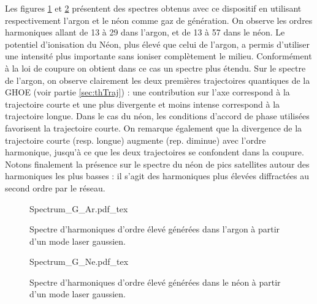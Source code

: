 Les figures \ref{Fig:SpectrumGAr} et \ref{Fig:SpectrumGNe} présentent des spectres obtenus avec ce dispositif en utilisant respectivement l'argon et le néon comme gaz de génération. On observe les ordres harmoniques allant de 13 à 29 dans l'argon, et de 13 à 57 dans le néon. Le potentiel d'ionisation du Néon, plus élevé que celui de l'argon, a permis d'utiliser une intensité plus importante sans ioniser complètement le milieu. Conformément à la loi de coupure on obtient dans ce cas un spectre plus étendu. Sur le spectre de l'argon, on observe clairement les deux premières trajectoires quantiques de la GHOE (voir partie \ref{sec:thTraj}) : une contribution sur l'axe correspond à la trajectoire courte et une plus divergente et moins intense correspond à la trajectoire longue. Dans le cas du néon, les conditions d'accord de phase utilisées favorisent la trajectoire courte. On remarque également que la divergence de la trajectoire courte (resp. longue) augmente (rep. diminue) avec l'ordre harmonique, jusqu'à ce que les deux trajectoires se confondent dans la coupure. Notons finalement la présence sur le spectre du néon de pics satellites autour des harmoniques les plus basses : il s'agit des harmoniques plus élevées diffractées au second ordre par le réseau.
\begin{figure}[!ht]
\centering
\def\svgwidth{\columnwidth}
{Spectrum_G_Ar.pdf_tex}
\caption{Spectre d'harmoniques d'ordre élevé générées dans l'argon à partir d'un mode laser gaussien.}
\label{Fig:SpectrumGAr}
\end{figure}
\begin{figure}[!ht]
\centering
\def\svgwidth{\columnwidth}
{Spectrum_G_Ne.pdf_tex}
\caption{Spectre d'harmoniques d'ordre élevé générées dans le néon à partir d'un mode laser gaussien.}
\label{Fig:SpectrumGNe}
\end{figure}
